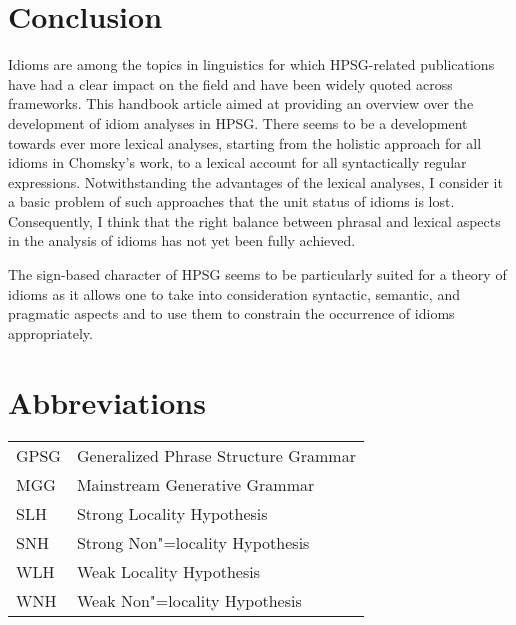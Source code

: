 \documentclass[output=paper,biblatex,babelshorthands,newtxmath,draftmode,colorlinks,citecolor=brown]{langscibook}
\begin{document}
\section{Conclusion}
\label{Sec-Summary}

Idioms are among the topics in linguistics for which HPSG-related publications have had a clear
impact on the field and have been widely quoted across frameworks.  This handbook article aimed at
providing an overview over the development of idiom analyses in HPSG.  There seems to be a
development towards ever more lexical analyses, starting from the holistic approach for all idioms
in Chomsky's work, to a lexical account for all syntactically regular expressions.  Notwithstanding
the advantages of the lexical analyses, I consider it a basic problem of such approaches that the
unit status of idioms is lost. Consequently, I think that the right balance between phrasal and
lexical aspects in the analysis of idioms has not yet been fully achieved.

The sign-based character of HPSG seems to be particularly suited for a theory of idioms as it allows
one to take into consideration syntactic, semantic, and pragmatic aspects and to use them to
constrain the occurrence of idioms appropriately.

\section*{Abbreviations}

\begin{tabular}{@{}ll}
GPSG & Generalized Phrase Structure Grammar \citep{GKPS85a}\\
MGG & Mainstream Generative Grammar\\
SLH & Strong Locality Hypothesis\\%
SNH & Strong Non"=locality Hypothesis\\%
WLH & Weak Locality Hypothesis\\%
WNH & Weak Non"=locality Hypothesis\\%
\end{tabular}
\end{document}
